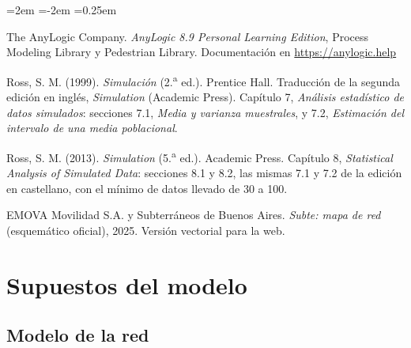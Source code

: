 \documentclass{article}
\begin{document}
\begin{list}{}{\leftmargin=2em \itemindent=-2em \itemsep=0.25em}
\item[] [19] The AnyLogic Company. \textit{AnyLogic 8.9 Personal Learning Edition}, Process Modeling Library y
  Pedestrian Library. Documentación en \url{https://anylogic.help}

\item[] [20] Ross, S. M. (1999). \textit{Simulación} (2.\textsuperscript{a} ed.). Prentice Hall. Traducción de la
  segunda edición en inglés, \textit{Simulation} (Academic Press). Capítulo 7, \textit{Análisis estadístico de
  datos simulados}: secciones 7.1, \textit{Media y varianza muestrales}, y 7.2, \textit{Estimación del
  intervalo de una media poblacional}.

\item[] [21] Ross, S. M. (2013). \textit{Simulation} (5.\textsuperscript{a} ed.). Academic Press. Capítulo 8,
  \textit{Statistical Analysis of Simulated Data}: secciones 8.1 y 8.2, las mismas 7.1 y 7.2 de la edición en
  castellano, con el mínimo de datos llevado de 30 a 100.

\item[] [22] EMOVA Movilidad S.A. y Subterráneos de Buenos Aires. \textit{Subte: mapa de red} (esquemático
  oficial), 2025. Versión vectorial para la web.

\end{list}

\appendix
\section{Supuestos del modelo}
\label{sec:anexo}

\subsection*{Modelo de la red}
\end{document}
